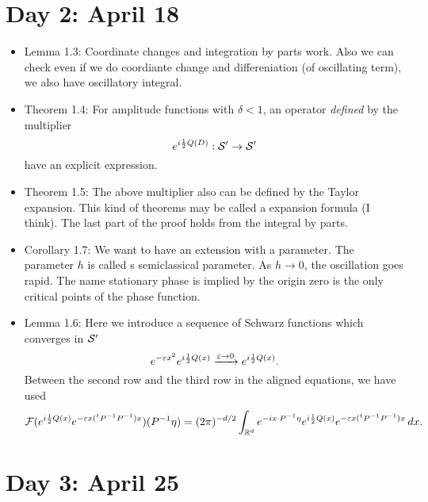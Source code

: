 \documentclass{../../small}
\begin{document}
\section{Day 2: April 18}
\begin{itemize}
\item Lemma 1.3:
Coordinate changes and integration by parts work.
Also we can check even if we do coordiante change and differeniation (of oscillating term), we also have oscillatory integral.
\item Theorem 1.4:
For amplitude functions with $\delta<1$, an operator \emph{defined} by the multiplier
\[e^{i\frac12Q(D)}:\mathcal{S}'\to\mathcal{S}'\]
have an explicit expression.
\item Theorem 1.5:
The above multiplier also can be defined by the Taylor expansion.
This kind of theorems may be called a expansion formula (I think).
The last part of the proof holds from the integral by parts.
\item Corollary 1.7:
We want to have an extension with a parameter.
The parameter $h$ is called s semiclassical parameter.
As $h\to0$, the oscillation goes rapid.
The name stationary phase is implied by the origin zero is the only critical points of the phase function.
\item Lemma 1.6:
Here we introduce a sequence of Schwarz functions which converges in $\mathcal{S}'$
\[e^{-\varepsilon x^2}e^{i\frac12Q(x)}\xrightarrow{\varepsilon\to0}e^{i\frac12Q(x)}.\]
Between the second row and the third row in the aligned equations, we have used
\[\mathcal{F}(e^{i\frac12Q(x)}e^{-\varepsilon x({}^tP^{-1}P^{-1})x})(P^{-1}\eta)=(2\pi)^{-d/2}\int_{\mathbb{R}^d}e^{-ix\cdot P^{-1}\eta}e^{i\frac12Q(x)}e^{-\varepsilon x({}^tP^{-1}P^{-1})x}\,dx.\]
\end{itemize}


\section{Day 3: April 25}
\end{document}
